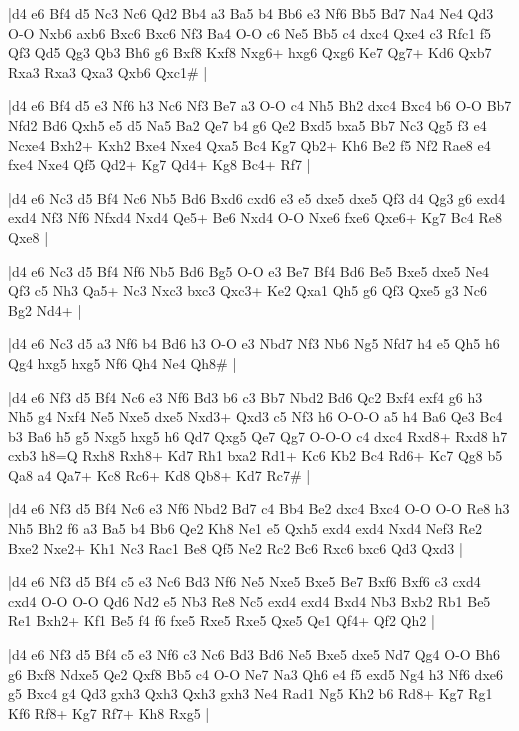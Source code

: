 \whitename{}
\blackname{}
\makegametitle
|d4 e6 Bf4 d5 Nc3 Nc6 Qd2 Bb4 a3 Ba5 b4 Bb6 e3 Nf6 Bb5 Bd7 Na4 Ne4 Qd3 O-O Nxb6 axb6 Bxc6 Bxc6 Nf3 Ba4 O-O c6 Ne5 Bb5 c4 dxc4 Qxe4 c3 Rfc1 f5 Qf3 Qd5 Qg3 Qb3 Bh6 g6 Bxf8 Kxf8 Nxg6+ hxg6 Qxg6 Ke7 Qg7+ Kd6 Qxb7 Rxa3 Rxa3 Qxa3 Qxb6 Qxc1\#  |

\whitename{}
\blackname{}
\makegametitle
|d4 e6 Bf4 d5 e3 Nf6 h3 Nc6 Nf3 Be7 a3 O-O c4 Nh5 Bh2 dxc4 Bxc4 b6 O-O Bb7 Nfd2 Bd6 Qxh5 e5 d5 Na5 Ba2 Qe7 b4 g6 Qe2 Bxd5 bxa5 Bb7 Nc3 Qg5 f3 e4 Ncxe4 Bxh2+ Kxh2 Bxe4 Nxe4 Qxa5 Bc4 Kg7 Qb2+ Kh6 Be2 f5 Nf2 Rae8 e4 fxe4 Nxe4 Qf5 Qd2+ Kg7 Qd4+ Kg8 Bc4+ Rf7  |

\whitename{}
\blackname{}
\makegametitle
|d4 e6 Nc3 d5 Bf4 Nc6 Nb5 Bd6 Bxd6 cxd6 e3 e5 dxe5 dxe5 Qf3 d4 Qg3 g6 exd4 exd4 Nf3 Nf6 Nfxd4 Nxd4 Qe5+ Be6 Nxd4 O-O Nxe6 fxe6 Qxe6+ Kg7 Bc4 Re8 Qxe8  |

\whitename{}
\blackname{}
\makegametitle
|d4 e6 Nc3 d5 Bf4 Nf6 Nb5 Bd6 Bg5 O-O e3 Be7 Bf4 Bd6 Be5 Bxe5 dxe5 Ne4 Qf3 c5 Nh3 Qa5+ Nc3 Nxc3 bxc3 Qxc3+ Ke2 Qxa1 Qh5 g6 Qf3 Qxe5 g3 Nc6 Bg2 Nd4+  |

\whitename{}
\blackname{}
\makegametitle
|d4 e6 Nc3 d5 a3 Nf6 b4 Bd6 h3 O-O e3 Nbd7 Nf3 Nb6 Ng5 Nfd7 h4 e5 Qh5 h6 Qg4 hxg5 hxg5 Nf6 Qh4 Ne4 Qh8\#  |

\whitename{}
\blackname{}
\makegametitle
|d4 e6 Nf3 d5 Bf4 Nc6 e3 Nf6 Bd3 b6 c3 Bb7 Nbd2 Bd6 Qc2 Bxf4 exf4 g6 h3 Nh5 g4 Nxf4 Ne5 Nxe5 dxe5 Nxd3+ Qxd3 c5 Nf3 h6 O-O-O a5 h4 Ba6 Qe3 Bc4 b3 Ba6 h5 g5 Nxg5 hxg5 h6 Qd7 Qxg5 Qe7 Qg7 O-O-O c4 dxc4 Rxd8+ Rxd8 h7 cxb3 h8=Q Rxh8 Rxh8+ Kd7 Rh1 bxa2 Rd1+ Kc6 Kb2 Bc4 Rd6+ Kc7 Qg8 b5 Qa8 a4 Qa7+ Kc8 Rc6+ Kd8 Qb8+ Kd7 Rc7\#  |

\whitename{}
\blackname{}
\makegametitle
|d4 e6 Nf3 d5 Bf4 Nc6 e3 Nf6 Nbd2 Bd7 c4 Bb4 Be2 dxc4 Bxc4 O-O O-O Re8 h3 Nh5 Bh2 f6 a3 Ba5 b4 Bb6 Qe2 Kh8 Ne1 e5 Qxh5 exd4 exd4 Nxd4 Nef3 Re2 Bxe2 Nxe2+ Kh1 Nc3 Rac1 Be8 Qf5 Ne2 Rc2 Bc6 Rxc6 bxc6 Qd3 Qxd3  |

\whitename{}
\blackname{}
\makegametitle
|d4 e6 Nf3 d5 Bf4 c5 e3 Nc6 Bd3 Nf6 Ne5 Nxe5 Bxe5 Be7 Bxf6 Bxf6 c3 cxd4 cxd4 O-O O-O Qd6 Nd2 e5 Nb3 Re8 Nc5 exd4 exd4 Bxd4 Nb3 Bxb2 Rb1 Be5 Re1 Bxh2+ Kf1 Be5 f4 f6 fxe5 Rxe5 Rxe5 Qxe5 Qe1 Qf4+ Qf2 Qh2  |

\whitename{}
\blackname{}
\makegametitle
|d4 e6 Nf3 d5 Bf4 c5 e3 Nf6 c3 Nc6 Bd3 Bd6 Ne5 Bxe5 dxe5 Nd7 Qg4 O-O Bh6 g6 Bxf8 Ndxe5 Qe2 Qxf8 Bb5 c4 O-O Ne7 Na3 Qh6 e4 f5 exd5 Ng4 h3 Nf6 dxe6 g5 Bxc4 g4 Qd3 gxh3 Qxh3 Qxh3 gxh3 Ne4 Rad1 Ng5 Kh2 b6 Rd8+ Kg7 Rg1 Kf6 Rf8+ Kg7 Rf7+ Kh8 Rxg5  |


